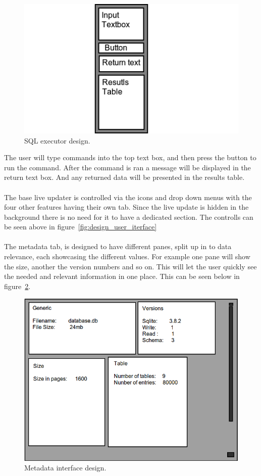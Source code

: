 \begin{figure}[H]
	\centering
	\includegraphics[scale=0.7]{images/ui_sqlexe_design.png}
	\caption{SQL executor design.}
	\label{fig:des_sql_exe}
\end{figure}

The user will type commands into the top text box, and then press the button to run the command. After the command is ran a message will be displayed in the return text box. And any returned data will be presented in the results table.
\\\\
The base live updater is controlled via the icons and drop down menus with the four other features having their own tab.  Since the live update is hidden in the background there is no need for it to have a dedicated section. The controlls can be seen above in figure~\ref{fig:design_user_iterface}
\\\\
The metadata tab, is designed to have different panes, split up in to data relevance, each showcasing the different values. For example one pane will show the size, another the version numbers and so on. This will let the user quickly see the needed and relevant information in one place. This can be seen below in figure~\ref{fig:des_ui_meta}. 

\begin{figure}[H]
	\centering
	\includegraphics[scale=0.32]{images/ui_meatadata.png}
	\caption{Metadata interface design.}
	\label{fig:des_ui_meta}
\end{figure}

